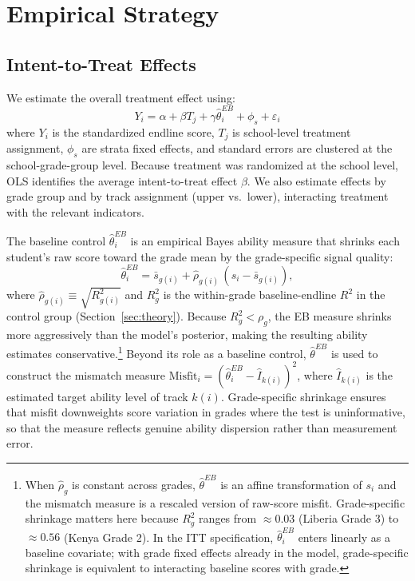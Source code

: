 \documentclass[11pt]{article}
\begin{document}
\section{Empirical Strategy}
\label{sec:strategy}

\subsection{Intent-to-Treat Effects}

We estimate the overall treatment effect using:
\begin{equation}
\label{eq:itt}
Y_i = \alpha + \beta T_j + \gamma \hat{\theta}^{EB}_i + \phi_s + \varepsilon_i
\end{equation}
where $Y_i$ is the standardized endline score, $T_j$ is school-level treatment assignment, $\phi_s$ are strata fixed effects, and standard errors are clustered at the school-grade-group level. Because treatment was randomized at the school level, OLS identifies the average intent-to-treat effect $\beta$. We also estimate effects by grade group and by track assignment (upper vs.\ lower), interacting treatment with the relevant indicators.

The baseline control $\hat{\theta}^{EB}_i$ is an empirical Bayes ability measure that shrinks each student's raw score toward the grade mean by the grade-specific signal quality:
\begin{equation}
\label{eq:eb}
\hat{\theta}^{EB}_{i} = \bar{s}_{g(i)} + \hat{\rho}_{g(i)}\,(s_i - \bar{s}_{g(i)}),
\end{equation}
where $\hat{\rho}_{g(i)} \equiv \sqrt{R^2_{g(i)}}$ and $R^2_g$ is the within-grade baseline-endline $R^2$ in the control group (Section~\ref{sec:theory}). Because $R^2_g < \rho_g$, the EB measure shrinks more aggressively than the model's posterior, making the resulting ability estimates conservative.\footnote{When $\hat{\rho}_g$ is constant across grades, $\hat{\theta}^{EB}$ is an affine transformation of $s_i$ and the mismatch measure is a rescaled version of raw-score misfit. Grade-specific shrinkage matters here because $R^2_g$ ranges from $\approx 0.03$ (Liberia Grade 3) to $\approx 0.56$ (Kenya Grade 2). In the ITT specification, $\hat{\theta}^{EB}_i$ enters linearly as a baseline covariate; with grade fixed effects already in the model, grade-specific shrinkage is equivalent to interacting baseline scores with grade.} Beyond its role as a baseline control, $\hat{\theta}^{EB}$ is used to construct the mismatch measure $\text{Misfit}_i = (\hat{\theta}^{EB}_i - \widehat{I}_{k(i)})^2$, where $\widehat{I}_{k(i)}$ is the estimated target ability level of track $k(i)$. Grade-specific shrinkage ensures that misfit downweights score variation in grades where the test is uninformative, so that the measure reflects genuine ability dispersion rather than measurement error.
\end{document}
